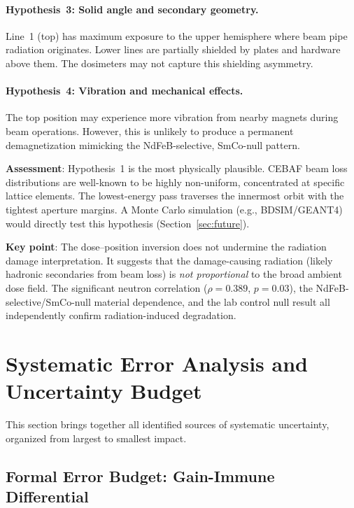 \documentclass[11pt,letterpaper]{article}
\newcommand{\CEBAF}{CEBAF}
\begin{document}
\paragraph{Hypothesis~3: Solid angle and secondary geometry.}
Line~1 (top) has maximum exposure to the upper hemisphere where beam pipe
radiation originates. Lower lines are partially shielded by plates and
hardware above them. The dosimeters may not capture this shielding asymmetry.

\paragraph{Hypothesis~4: Vibration and mechanical effects.}
The top position may experience more vibration from nearby magnets during
beam operations. However, this is unlikely to produce a permanent
demagnetization mimicking the NdFeB-selective, SmCo-null pattern.

\textbf{Assessment}: Hypothesis~1 is the most physically plausible. \CEBAF
beam loss distributions are well-known to be highly non-uniform, concentrated
at specific lattice elements. The lowest-energy pass traverses the innermost
orbit with the tightest aperture margins. A Monte Carlo simulation (e.g.,
BDSIM/GEANT4) would directly test this hypothesis (Section~\ref{sec:future}).

\textbf{Key point}: The dose--position inversion does not undermine the
radiation damage interpretation. It suggests that the damage-causing radiation
(likely hadronic secondaries from beam loss) is \emph{not proportional} to the
broad ambient dose field. The significant neutron correlation ($\rho = 0.389$,
$p = 0.03$), the NdFeB-selective/SmCo-null material dependence, and the lab
control null result all independently confirm radiation-induced degradation.

\section{Systematic Error Analysis and Uncertainty Budget}
\label{sec:systematics}

This section brings together all identified sources of systematic uncertainty,
organized from largest to smallest impact.

\subsection{Formal Error Budget: Gain-Immune Differential}
\end{document}
